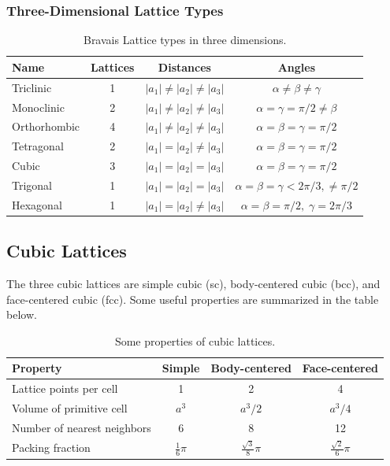 \subsubsection{Three-Dimensional Lattice Types}
\begin{table}[h]
    \centering
    \begin{tabular}{l|c|c|c}
        \textbf{Name} & \textbf{Lattices} & \textbf{Distances} & \textbf{Angles} \\
        \hline
        Triclinic    & 1 & $|a_1|\neq |a_2|\neq |a_3|$ & $\alpha\neq\beta\neq\gamma$ \\
        Monoclinic   & 2 & $|a_1|\neq |a_2|\neq |a_3|$ & $\alpha=\gamma=\pi/2\neq\beta$ \\
        Orthorhombic & 4 & $|a_1|\neq |a_2|\neq |a_3|$ & $\alpha=\beta=\gamma=\pi/2$ \\
        Tetragonal   & 2 & $|a_1|=|a_2|\neq |a_3|$     & $\alpha=\beta=\gamma=\pi/2$ \\
        Cubic        & 3 & $|a_1|=|a_2|=|a_3|$         & $\alpha=\beta=\gamma=\pi/2$ \\
        Trigonal     & 1 & $|a_1|=|a_2|=|a_3|$         & $\alpha=\beta=\gamma<2\pi/3,\neq\pi/2$ \\
        Hexagonal    & 1 & $|a_1|=|a_2|\neq |a_3|$     & $\alpha=\beta=\pi/2,\; \gamma=2\pi/3$ \\
    \end{tabular}
    \caption{Bravais Lattice types in three dimensions.}
    \label{tab:3d-bravais}
\end{table}


\subsection{Cubic Lattices}
The three cubic lattices are simple cubic (sc), body-centered cubic (bcc), and face-centered cubic (fcc). Some useful properties are summarized in the table below.

\begin{table}[h!]
    \centering
    \begin{tabular}{l|c|c|c}
        \textbf{Property} & \textbf{Simple} & \textbf{Body-centered} & \textbf{Face-centered} \\
        \hline
        Lattice points per cell & 1 & 2 & 4 \\
        Volume of primitive cell & $a^3$ & $a^3/2$ & $a^3/4$ \\
        Number of nearest neighbors & 6 & 8 & 12 \\
        Packing fraction &  $\frac{1}{6}\pi$ & $\frac{\sqrt{3}}{8}\pi$ & $\frac{\sqrt{2}}{6}\pi$
    \end{tabular}
    \caption{Some properties of cubic lattices.}
    \label{tab:cubic-properties}
\end{table}

